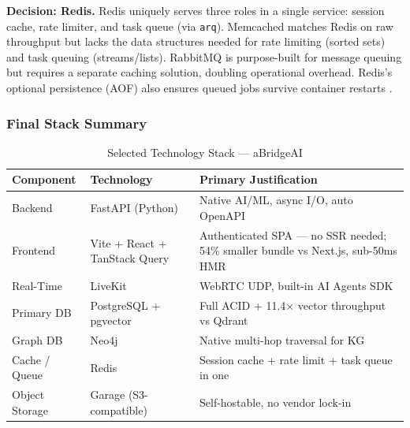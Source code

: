 \textbf{Decision: Redis.} Redis uniquely serves three roles in a single service: session cache, rate limiter, and task queue (via \texttt{arq}). Memcached matches Redis on raw throughput but lacks the data structures needed for rate limiting (sorted sets) and task queuing (streams/lists). RabbitMQ is purpose-built for message queuing but requires a separate caching solution, doubling operational overhead. Redis's optional persistence (AOF) also ensures queued jobs survive container restarts \cite{redis2024benchmark}.

\subsubsection{Final Stack Summary}

\begin{table}[H]
    \caption{Selected Technology Stack — aBridgeAI}
    \centering
    \renewcommand{\arraystretch}{1.3}
    \begin{tabular}{|p{}|p{}|p{}|}
        \hline
        \textbf{Component} & \textbf{Technology} & \textbf{Primary Justification} \\
        \hline
        Backend & FastAPI (Python) & Native AI/ML, async I/O, auto OpenAPI \\
        \hline
        Frontend & Vite + React + TanStack Query & Authenticated SPA — no SSR needed; 54\% smaller bundle vs Next.js, sub-50ms HMR \\
        \hline
        Real-Time & LiveKit & WebRTC UDP, built-in AI Agents SDK \\
        \hline
        Primary DB & PostgreSQL + pgvector & Full ACID + 11.4$\times$ vector throughput vs Qdrant \\
        \hline
        Graph DB & Neo4j & Native multi-hop traversal for KG \\
        \hline
        Cache / Queue & Redis & Session cache + rate limit + task queue in one \\
        \hline
        Object Storage & Garage (S3-compatible) & Self-hostable, no vendor lock-in \\
        \hline
    \end{tabular}
\end{table}

